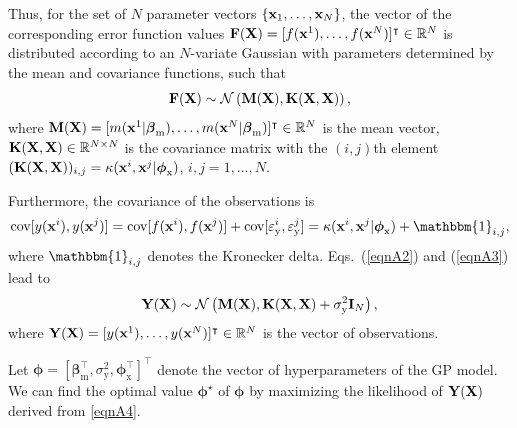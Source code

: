 \documentclass[journal ]{new-aiaa}
\newcommand{\edit}[1]{\textcolor{red!80!black}{#1}} %
\begin{document}
	Thus, for the set of $N$ parameter vectors $\{{\bf x}_1,\dots,\textbf{x}_N \}$, the vector of the corresponding error function values ${\bf F}({\bf X})=[f({\bf x}^1),\dots,f({\bf x}^N)]^\intercal \in \mathbb{R}^N$ is distributed according to %
	{an $N$-variate Gaussian with parameters determined by the mean
		and covariance functions, such that}
	\begin{equation}\label{eqnA2}
		{\bf F}({\bf X}) \sim \mathcal{N} \left({\bf M}({\bf X}),{\bf K}({\bf X},{\bf X})\right),
	\end{equation}
	where ${\bf M}({\bf X})=[m({\bf x}^1|\boldsymbol \beta_{\text{m}}),\dots,m({\bf x}^N|\boldsymbol \beta_{\text{m}})]^\intercal \in \mathbb{R}^N$ is the mean vector, ${\bf K}({\bf X},{\bf X}) \in \mathbb{R}^{N \times N}$ is the covariance matrix with the $(i,j)$th element $({\bf K}({\bf X},{\bf X}))_{i,j} = \kappa({\bf x}^i,{\bf x}^j|\boldsymbol \phi_{\text{x}})$, $i,j=1,\dots,N$.
	
	Furthermore, the covariance of the observations is
	\begin{equation}\label{eqnA3}
		\text{cov}[y({\bf x}^i),y({\bf x}^j)]  = \text{cov}[f({\bf x}^i),f({\bf x}^j)] + \text{cov}[\varepsilon_\text{y}^i,\varepsilon_\text{y}^j]
		= \kappa({\bf x}^i,{\bf x}^j|\boldsymbol \phi_{\text{x}}) + \mathbbm{1}_{i,j},
	\end{equation}
	where $\mathbbm{1}_{i,j}$ denotes the Kronecker delta. Eqs.~(\ref{eqnA2}) and (\ref{eqnA3}) lead to
	\begin{equation}\label{eqnA4}
		{\bf Y}({\bf X}) \sim \mathcal{N} \left({\bf M}({\bf X}),{\bf K}({\bf X},{\bf X})+\sigma^2_\text{y} {\bf I}_N\right),
	\end{equation}
	where ${\bf Y}({\bf X})=[y({\bf x}^1),\dots,y({\bf x}^N)]^\intercal \in \mathbb{R}^N$ is the vector of observations.
	
	Let ${\boldsymbol \phi} = [\boldsymbol \beta_{\text{m}}^\intercal,\sigma^2_\text{y},\boldsymbol \phi_{\text{x}}^\intercal]^\intercal$ denote the vector of hyperparameters of the GP model.
	We can find the optimal value ${\boldsymbol \phi^\star}$ of ${\boldsymbol \phi}$ by maximizing the likelihood of ${\bf Y}({\bf X})$ derived from \cref{eqnA4}.
	
\end{document}
